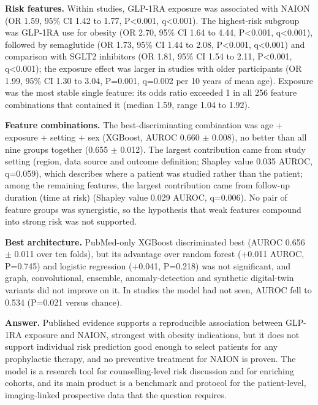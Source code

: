 \documentclass[journal]{IEEEtran}
\begin{document}
\textbf{Risk features.} Within studies, GLP-1RA exposure was associated
with NAION (OR 1.59, 95\% CI 1.42 to 1.77, P\textless0.001,
q\textless0.001). The highest-risk subgroup was GLP-1RA use for obesity
(OR 2.70, 95\% CI 1.64 to 4.44, P\textless0.001, q\textless0.001),
followed by semaglutide (OR 1.73, 95\% CI 1.44 to 2.08, P\textless0.001,
q\textless0.001) and comparison with SGLT2 inhibitors (OR 1.81, 95\% CI
1.54 to 2.11, P\textless0.001, q\textless0.001); the exposure effect was
larger in studies with older participants (OR 1.99, 95\% CI 1.30 to
3.04, P=0.001, q=0.002 per 10 years of mean age). Exposure was the most
stable single feature: its odds ratio exceeded 1 in all 256 feature
combinations that contained it (median 1.59, range 1.04 to 1.92).

\textbf{Feature combinations.} The best-discriminating combination was
age + exposure + setting + sex (XGBoost, AUROC 0.660 \ensuremath{\pm} 0.008), no better
than all nine groups together (0.655 \ensuremath{\pm} 0.012). The largest contribution
came from study setting (region, data source and outcome definition;
Shapley value 0.035 AUROC, q=0.059), which describes where a patient was
studied rather than the patient; among the remaining features, the
largest contribution came from follow-up duration (time at risk)
(Shapley value 0.029 AUROC, q=0.006). No pair of feature groups was
synergistic, so the hypothesis that weak features compound into strong
risk was not supported.

\textbf{Best architecture.} PubMed-only XGBoost discriminated best
(AUROC 0.656 \ensuremath{\pm} 0.011 over ten folds), but its advantage over random
forest (+0.011 AUROC, P=0.745) and logistic regression (+0.041, P=0.218)
was not significant, and graph, convolutional, ensemble,
anomaly-detection and synthetic digital-twin variants did not improve on
it. In studies the model had not seen, AUROC fell to 0.534 (P=0.021
versus chance).

\textbf{Answer.} Published evidence supports a reproducible association
between GLP-1RA exposure and NAION, strongest with obesity indications,
but it does not support individual risk prediction good enough to select
patients for any prophylactic therapy, and no preventive treatment for
NAION is proven. The model is a research tool for counselling-level risk
discussion and for enriching cohorts, and its main product is a
benchmark and protocol for the patient-level, imaging-linked prospective
data that the question requires.

\clearpage\onecolumn
\appendices
\end{document}
